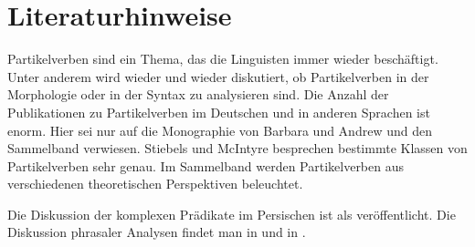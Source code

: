 \section*{Literaturhinweise}

Partikelverben sind ein Thema, das die Linguisten immer wieder beschäftigt. Unter anderem wird
wieder und wieder diskutiert, ob Partikelverben in der Morphologie oder in der Syntax zu analysieren
sind. Die Anzahl der Publikationen zu Partikelverben im Deutschen und in anderen Sprachen ist
enorm. Hier sei nur auf die Monographie von Barbara \citet{Stiebels96a} und Andrew \citet{McIntyre2001a} und den Sammelband
 verwiesen. Stiebels und McIntyre besprechen bestimmte Klassen von Partikelverben sehr genau.
Im Sammelband werden Partikelverben aus verschiedenen theoretischen Perspektiven beleuchtet.

Die Diskussion der komplexen Prädikate im Persischen ist als 
veröffentlicht. Die Diskussion phrasaler Analysen findet man in  und in .
